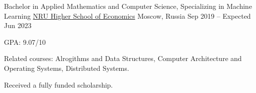 

\begin{cventries}

  \cventry
  {Bachelor in Applied Mathematics and Computer Science, Specializing in Machine Learning} %
  {\href{https://www.hse.ru/en/}{NRU Higher School of Economics}} %
  {Moscow, Russia} %
  {Sep 2019 -- Expected Jun 2023} %
  {
    \begin{cvitems} %
      \item GPA: 9.07/10
      \item Related courses: Alrogithms and Data Structures, Computer Architecture and Operating Systems, Distributed Systems.
      \item Received a fully funded scholarship.
    \end{cvitems}
  }

\end{cventries}

